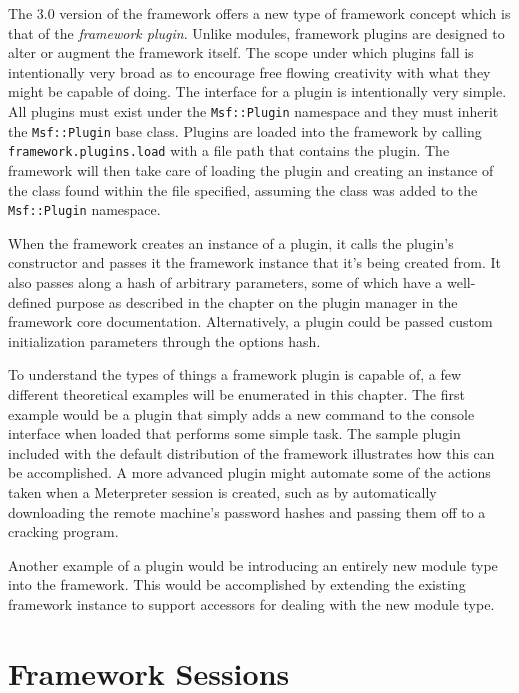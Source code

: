 \documentclass{report}
\begin{document}
\par
The 3.0 version of the framework offers a new type of framework
concept which is that of the \textit{framework plugin}.  Unlike
modules, framework plugins are designed to alter or augment the
framework itself.  The scope under which plugins fall is
intentionally very broad as to encourage free flowing creativity
with what they might be capable of doing.  The interface for a
plugin is intentionally very simple.  All plugins must exist under
the \texttt{Msf::Plugin} namespace and they must inherit the
\texttt{Msf::Plugin} base class.  Plugins are loaded into the
framework by calling \texttt{framework.plugins.load} with a file
path that contains the plugin.  The framework will then take care of
loading the plugin and creating an instance of the class found
within the file specified, assuming the class was added to the
\texttt{Msf::Plugin} namespace.

\par
When the framework creates an instance of a plugin, it calls the
plugin's constructor and passes it the framework instance that it's
being created from.  It also passes along a hash of arbitrary
parameters, some of which have a well-defined purpose as described
in the chapter on the plugin manager in the framework core
documentation.  Alternatively, a plugin could be passed custom
initialization parameters through the options hash.

\par
To understand the types of things a framework plugin is capable of,
a few different theoretical examples will be enumerated in this
chapter.  The first example would be a plugin that simply adds a new
command to the console interface when loaded that performs some
simple task.  The sample plugin included with the default
distribution of the framework illustrates how this can be
accomplished.  A more advanced plugin might automate some of the
actions taken when a Meterpreter session is created, such as by
automatically downloading the remote machine's password hashes and
passing them off to a cracking program.

\par
Another example of a plugin would be introducing an entirely new
module type into the framework.  This would be accomplished by
extending the existing framework instance to support accessors for
dealing with the new module type.

\chapter{Framework Sessions}
\label{framework-sessions}
\end{document}
